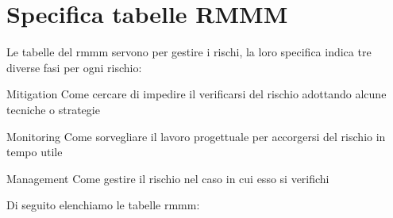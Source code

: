 \section{Specifica tabelle RMMM}
Le tabelle del \gls{rmmm} servono per gestire i rischi, la loro specifica indica tre diverse fasi per ogni rischio:
\begin{descriptionInd}
	\item[Mitigation] Come cercare di impedire il verificarsi del rischio adottando alcune tecniche o strategie
	\item[Monitoring] Come sorvegliare il lavoro progettuale per accorgersi del rischio in tempo utile
	\item[Management] Come gestire il rischio nel caso in cui esso si verifichi
\end{descriptionInd}
Di seguito elenchiamo le tabelle \gls{rmmm}:

